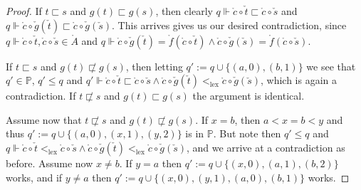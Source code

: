 \documentclass[10pt,a4paper]{amsart}
\newcommand\lex{\mathrm{lex}}
\newcommand{\ck}[1]{\check{#1}}
\newcommand{\dt}[1]{\mathring{#1}}
\newcommand{\tle}{\sqsubset}
\renewcommand{\P}{\mathbb{P}}
\begin{document}
\begin{proof}
  If $t \tle s$ and $g(t) \tle g(s)$, then clearly
  $q \Vdash \dt{c} \circ \ck{t} \tle \dt{c} \circ \ck{s}$ and
  $q \Vdash \dt{c} \circ \ck{g}(\ck{t}) \tle \dt{c} \circ \ck{g}(\ck{s})$.
  This arrives gives us our desired contradiction, since
  $q \Vdash \dt{c} \circ \ck{t}, \dt{c} \circ \ck{s} \in \dt{A}$ and
  $q \Vdash \dt{c} \circ \ck{g}(\ck{t}) = \dt{f}(\dt{c} \circ \ck{t}) \land
  \dt{c} \circ \ck{g}(\ck{s}) = \dt{f}(\dt{c} \circ \ck{s})$.

  If $t \tle s$ and $g(t) \not\tle g(s)$, then
  letting $q' := q \cup \{(a,0),(b,1)\}$ we see that $q' \in \P$,
  $q' \le q$ and
  $q' \Vdash \dt{c} \circ \ck{t} \tle \dt{c} \circ \ck{s} \land
  \dt{c} \circ \ck{g}(\ck{t}) <_{\lex} \dt{c} \circ \ck{g}(\ck{s})$,
  which is again a contradiction.
  If $t \not\tle s$ and $g(t) \tle g(s)$ the argument is identical.

  Assume now that $t \not\tle s$ and $g(t) \not\tle g(s)$.
  If $x = b$,
  then $a < x = b < y$ and thus
  $q' := q \cup \{(a,0),(x,1),(y,2)\}$ is in $\P$. But note then
  $q' \le q$ and
  $q \Vdash \dt{c} \circ \ck{t} <_{\lex} \dt{c} \circ \ck{s}
  \land \dt{c} \circ \ck{g}(\ck{t}) <_{\lex} \dt{c} \circ \ck{g}(\ck{s})$,
  and we arrive at a contradiction as before. Assume now $x \neq b$.
  If $y = a$
  then $q' := q \cup \{(x,0),(a,1),(b,2)\}$ works, and if $y \neq a$
  then $q' := q \cup \{(x,0),(y,1),(a,0),(b,1)\}$ works.
\end{proof}
\end{document}
